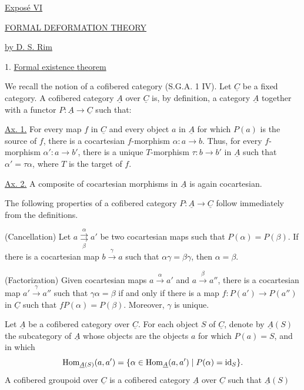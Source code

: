 
\begin{center}
\underline{Expos\'e VI}

\vspace{1em}
\underline{\underline{FORMAL DEFORMATION THEORY}}

\vspace{1em}
\underline{by D. S. Rim}
\end{center}

1. \underline{Formal existence theorem}

We recall the notion of a cofibered category (S.G.A. 1 IV). Let
$\underline C$ be a fixed category. A cofibered category $\underline A$
over $\underline C$ is, by definition, a category $\underline A$
together with a functor $P:\underline A\longrightarrow\underline C$
such that:

\underline{Ax. 1.} For every map $f$ in $\underline C$ and every object
$a$ in $\underline A$ for which $P(a)$ is the source of $f$, there is a
cocartesian $f$-morphism $\alpha:a\longrightarrow b$. Thus, for every
$f$-morphism $\alpha':a\longrightarrow b'$, there is a unique
$T$-morphism $\tau:b\longrightarrow b'$ in $\underline A$ such that
$\alpha'=\tau\alpha$, where $T$ is the target of $f$.

\underline{Ax. 2.} A composite of cocartesian morphisms in
$\underline A$ is again cocartesian.

The following properties of a cofibered category
$P:\underline A\longrightarrow\underline C$ follow immediately from
the definitions.

(Cancellation) Let
$a\overset{\alpha}{\underset{\beta}{\rightrightarrows}}a'$ be two
cocartesian maps such that $P(\alpha)=P(\beta)$. If there is a
cocartesian map $b\xrightarrow{\gamma}a$ such that
$\alpha\gamma=\beta\gamma$, then $\alpha=\beta$.

(Factorization) Given cocartesian maps
$a\xrightarrow{\alpha}a'$ and $a\xrightarrow{\beta}a''$, there is a
cocartesian map $a'\xrightarrow{\gamma}a''$ such that
$\gamma\alpha=\beta$ if and only if there is a map
$f:P(a')\longrightarrow P(a'')$ in $\underline C$ such that
$fP(\alpha)=P(\beta)$. Moreover, $\gamma$ is unique.

Let $\underline A$ be a cofibered category over $\underline C$. For each
object $S$ of $\underline C$, denote by $\underline A(S)$ the
subcategory of $\underline A$ whose objects are the objects $a$ for
which $P(a)=S$, and in which
\[
 \Hom_{\underline A(S)}(a,a')=
 \{\alpha\in\Hom_{\underline A}(a,a')\mid P(\alpha)=\id_S\}.
\]
A cofibered groupoid over $\underline C$ is a cofibered category
$\underline A$ over $\underline C$ such that $\underline A(S)$

